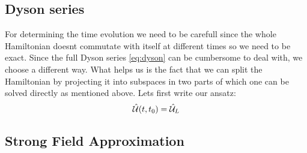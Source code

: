 \subsection{Dyson series}

For determining the time evolution we need to be carefull since the whole Hamiltonian doesnt commutate with itself at different times so we need to be exact. 
Since the full Dyson series \eqref{eq:dyson} can be cumbersome to deal with, we choose a different way. 
What helps us is the fact that we can split the Hamiltonian by projecting it into subspaces in two parts of which one can be solved directly as mentioned above. 
Lets first write our ansatz:
\begin{equation}
    \hat{\mathcal{U}}(t,t_0)=\hat{\mathcal{U}}_L
\end{equation}

\subsection{Strong Field Approximation}

